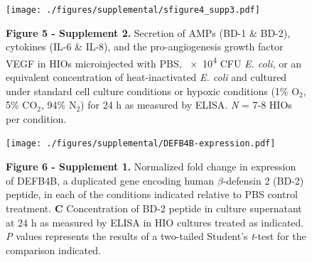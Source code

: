 \documentclass[9pt,lineo]{elife}
\begin{document}
\begin{figure}
\begin{fullwidth}
\centering\texttt{[image: ./figures/supplemental/sfigure4\_supp3.pdf]}
\caption*{\textbf{Figure 5 - Supplement 2. } Secretion of AMPs (BD-1 \& BD-2), cytokines (IL-6 \& IL-8), and the pro-angiogenesis growth factor VEGF in HIOs microinjected with PBS, \num{e4} CFU \textit{E. coli}, or an equivalent concentration of heat-inactivated \textit{E. coli} and cultured under standard cell culture conditions or hypoxic conditions (1\% O$_{2}$, 5\% CO$_{2}$, 94\% N$_{2}$) for 24 h as measured by ELISA. \textit{N} = 7-8 HIOs per condition.}
\label{fig:fullwidth}
\end{fullwidth}
\end{figure}
\begin{figure}
\begin{fullwidth}
\centering\texttt{[image: ./figures/supplemental/DEFB4B-expression.pdf]}
\caption*{\textbf{Figure 6 - Supplement 1. }Normalized fold change in expression of DEFB4B, a duplicated gene encoding human $\beta$-defensin 2 (BD-2) peptide, in each of the conditions indicated relative to PBS control treatment. \textbf{C} Concentration of BD-2 peptide in culture supernatant at 24 h as measured by ELISA in HIO cultures treated as indicated. \textit{P} values represents the results of a two-tailed Student's \textit{t}-test for the comparison indicated.}
\label{fig:fullwidth}
\end{fullwidth}
\end{figure}
\end{document}
